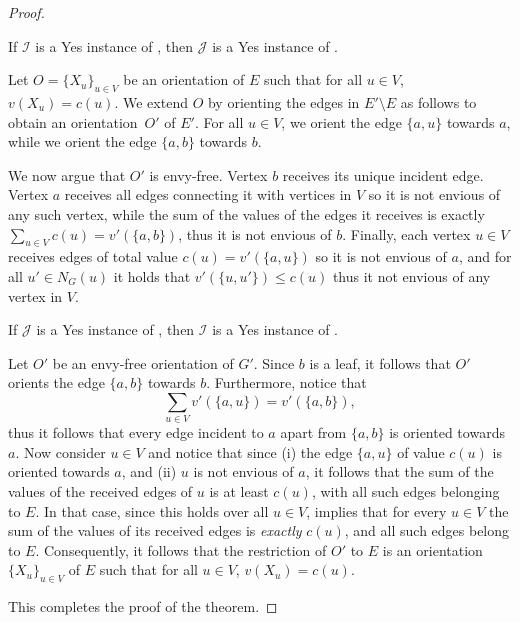 \begin{proof}
    \begin{claim}
        If $\mathcal{I}$ is a Yes instance of {\TOO},
        then $\mathcal{J}$ is a Yes instance of \EFo.
    \end{claim}

    \begin{nestedproof}
        Let $O=\{X_u\}_{u \in V}$ be an orientation of $E$ such that for all $u \in V$, $v(X_u) = c(u)$.
        We extend $O$ by orienting the edges in $E' \setminus E$ as follows to obtain an orientation~$O'$ of $E'$.
        For all $u \in V$, we orient the edge $\{a,u\}$ towards $a$, while we orient the edge $\{a,b\}$ towards $b$.

        We now argue that $O'$ is envy-free.
        Vertex $b$ receives its unique incident edge.
        Vertex $a$ receives all edges connecting it with vertices in $V$ so it is not envious of any such vertex,
        while the sum of the values of the edges it receives is exactly $\sum_{u \in V} c(u) = v'(\{a,b\})$, thus it is not envious of $b$.
        Finally, each vertex $u \in V$ receives edges of total value $c(u) = v'(\{a,u\})$ so it is not envious of $a$,
        and for all $u' \in N_G (u)$ it holds that $v'(\{u,u'\}) \le c(u)$ thus it not envious of any vertex in $V$.
    \end{nestedproof}

    \begin{claim}
        If $\mathcal{J}$ is a Yes instance of \EFo,
        then $\mathcal{I}$ is a Yes instance of {\TOO}.
    \end{claim}

    \begin{nestedproof}
        Let $O'$ be an envy-free orientation of $G'$.
        Since $b$ is a leaf, it follows that $O'$ orients the edge $\{a,b\}$ towards $b$.
        Furthermore, notice that
        \[
            \sum_{u \in V} v'(\{a,u\}) = v'(\{a,b\}),
        \]
        thus it follows that every edge incident to $a$ apart from $\{a,b\}$ is oriented towards $a$.
        Now consider $u \in V$ and notice that since
        (i) the edge $\{a,u\}$ of value $c(u)$ is oriented towards $a$,
        and (ii) $u$ is not envious of $a$,
        it follows that the sum of the values of the received edges of $u$ is at least $c(u)$,
        with all such edges belonging to $E$.
        In that case, since this holds over all $u \in V$,
         implies that for every $u \in V$ the sum of the values of its received edges is \emph{exactly} $c(u)$,
        and all such edges belong to $E$.
        Consequently, it follows that the restriction of $O'$ to $E$ is an orientation $\{X_u\}_{u \in V}$ of $E$ such that for all $u \in V$, $v(X_u) = c(u)$.
    \end{nestedproof}
    This completes the proof of the theorem.
\end{proof}

